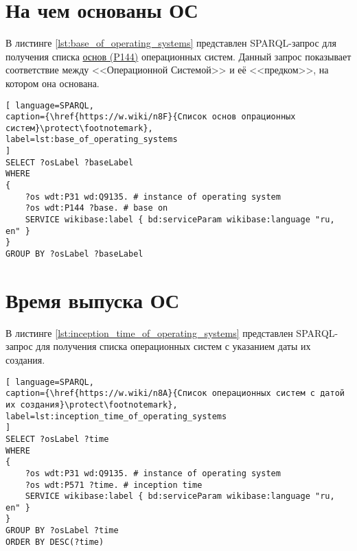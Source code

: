 \section{На чем основаны ОС}
В листинге \ref{lst:base_of_operating_systems} представлен SPARQL-запрос для получения списка \href{https://www.wikidata.org/wiki/Property_talk:P144}{основ (P144)} операционных систем. Данный запрос показывает соответствие между <<Операционной Системой>> и её <<предком>>, на котором она основана.



\begin{lstlisting}[ language=SPARQL, 
caption={\href{https://w.wiki/n8F}{Список основ опрационных систем}\protect\footnotemark},
label=lst:base_of_operating_systems
]
SELECT ?osLabel ?baseLabel
WHERE
{
	?os wdt:P31 wd:Q9135. # instance of operating system
	?os wdt:P144 ?base. # base on 
	SERVICE wikibase:label { bd:serviceParam wikibase:language "ru, en" }
}
GROUP BY ?osLabel ?baseLabel
\end{lstlisting}


\section{Время выпуска ОС}

В листинге \ref{lst:inception_time_of_operating_systems} представлен SPARQL-запрос для получения списка операционных систем с указанием даты их создания.
\begin{lstlisting}[ language=SPARQL, 
caption={\href{https://w.wiki/n8A}{Список операционных систем с датой их создания}\protect\footnotemark},
label=lst:inception_time_of_operating_systems
]
SELECT ?osLabel ?time
WHERE
{
	?os wdt:P31 wd:Q9135. # instance of operating system
	?os wdt:P571 ?time. # inception time
	SERVICE wikibase:label { bd:serviceParam wikibase:language "ru, en" }
}
GROUP BY ?osLabel ?time
ORDER BY DESC(?time)
\end{lstlisting}

